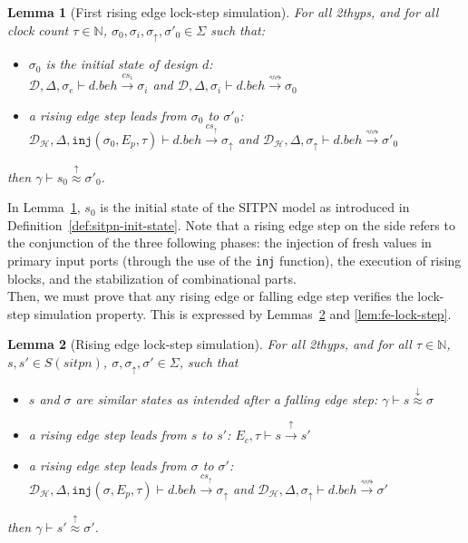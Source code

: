 \documentclass[pdflatex,sn-mathphys]{sn-jnl}%
\theoremstyle{thmstyleone}%
\theoremstyle{thmstyletwo}%
\theoremstyle{thmstylethree}%
\newtheorem{lemma}{Lemma}%
\begin{document}
\begin{lemma}[First rising edge lock-step simulation]
  \label{lem:fst-re-lock-step}
  For all \hm2thyps{}, and for all clock count $\tau\in\mathbb{N}$,
  $\sigma_0,\sigma_i,\sigma_{\uparrow},\sigma'_0\in{}\Sigma$ such that:
  \begin{itemize}
  \item $\sigma_0$ is the initial state of design $d$:\\
    $\mathcal{D},\Delta,\sigma_e\vdash{}d.beh\xrightarrow{cs_i}{}\sigma_i$ and
    $\mathcal{D},\Delta,\sigma_i\vdash{}d.beh\xrightarrow{\rightsquigarrow}{}\sigma_0$
    
  \item a rising edge step leads from $\sigma_0$ to $\sigma'_0$:\\
    $\mathcal{D}_\mathcal{H},\Delta,\mathtt{inj}(\sigma_0,E_p,\tau)\vdash{}d.beh\xrightarrow{cs_{\uparrow}}\sigma_{\uparrow}$
    and
    $\mathcal{D}_\mathcal{H},\Delta,\sigma_{\uparrow}\vdash{}d.beh\xrightarrow{\rightsquigarrow}\sigma'_0$
  \end{itemize}
  then $\gamma\vdash{}s_0\stackrel{\uparrow}{\approx}\sigma'_0$.
\end{lemma}
In Lemma~\ref{lem:fst-re-lock-step}, $s_0$ is the initial state of the
SITPN model as introduced in
Definition~\ref{def:sitpn-init-state}.  Note that a rising edge step on the \hvhdl{} side refers to the conjunction of the three following phases: the injection of fresh values in primary input ports (through the use of the \texttt{inj} function), the execution of rising blocks, and the stabilization of combinational parts. \\

Then, we must prove that any rising edge or falling edge step verifies
the lock-step simulation property. This is expressed by
Lemmas~\ref{lem:re-lock-step} and \ref{lem:fe-lock-step}. 

\begin{lemma}[Rising edge lock-step simulation]
  \label{lem:re-lock-step}
  For all \hm2thyps{}, and for all $\tau\in\mathbb{N}$,
  $s,s'\in{}S(sitpn)$, $\sigma,\sigma_\uparrow,\sigma'\in\Sigma$, such
  that
  \begin{itemize}
  \item $s$ and $\sigma$ are similar states as intended after a
    falling edge step:
    $\gamma\vdash{}s\stackrel{\downarrow}{\approx}\sigma$
  \item a rising edge step leads from $s$ to $s'$:
    $E_c,\tau\vdash{}s\xrightarrow{\uparrow}s'$
  \item a rising edge step leads from $\sigma$ to $\sigma'$:\\
    $\mathcal{D}_\mathcal{H},\Delta,\mathtt{inj}(\sigma,E_p,\tau)\vdash{}d.beh\xrightarrow{cs_{\uparrow}}\sigma_{\uparrow}$
    and
    $\mathcal{D}_\mathcal{H},\Delta,\sigma_{\uparrow}\vdash{}d.beh\xrightarrow{\rightsquigarrow}\sigma'$
  \end{itemize}
  then $\gamma\vdash{}s'\stackrel{\uparrow}{\approx}{}\sigma'$.
  
\end{lemma}
\end{document}
